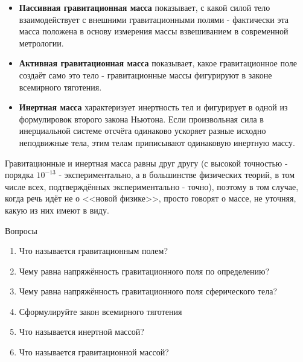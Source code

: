 \documentclass[a6paper, 11pt]{diss_4}
\renewcommand{\'}{\,'}
\begin{document}
\begin{itemize}

  \item \textbf{Пассивная гравитационная масса} показывает, с какой силой тело
взаимодействует с внешними гравитационными полями - фактически эта масса
положена в основу измерения массы взвешиванием в современной метрологии.

  \item \textbf{Активная гравитационная масса} показывает, какое гравитационное
поле создаёт само это тело - гравитационные массы фигурируют в законе
всемирного тяготения.

  \item \textbf{Инертная масса} характеризует инертность тел и фигурирует в
одной из формулировок второго закона Ньютона. Если произвольная сила в
инерциальной системе отсчёта одинаково ускоряет разные исходно неподвижные
тела, этим телам приписывают одинаковую инертную массу.

\end{itemize}

  Гравитационные и инертная масса равны друг другу (с высокой точностью -
порядка $10^{-13}$ - экспериментально, а в большинстве физических теорий, в том
числе всех, подтверждённых экспериментально - точно), поэтому в том случае,
когда речь идёт не о <<новой физике>>, просто говорят о массе, не уточняя, какую
из них имеют в виду.

\begin{center}
   Вопросы
\end{center}
\begin{enumerate}
\item Что называется гравитационным полем?
\item Чему равна напряжённость гравитационного поля по определению?
\item Чему равна напряжённость гравитационного поля сферического тела?
\item Сформулируйте закон всемирного тяготения
\item Что называется инертной массой?
\item Что называется гравитационной массой?
\end{enumerate}
\end{document}
